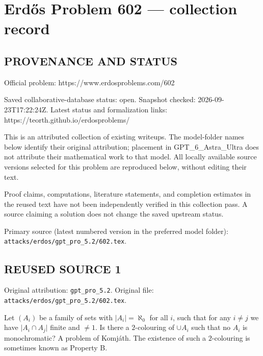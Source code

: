 \section*{Erd\H{o}s Problem 602 --- collection record}

\subsection*{PROVENANCE AND STATUS}
Official problem: https://www.erdosproblems.com/602

Saved collaborative-database status: open.
Snapshot checked: 2026-09-23T17:22:24Z.
Latest status and formalization links: https://teorth.github.io/erdosproblems/

This is an attributed collection of existing writeups. The model-folder names below identify their original attribution; placement in GPT\_6\_Astra\_Ultra does not attribute their mathematical work to that model. All locally available source versions selected for this problem are reproduced below, without editing their text.

Proof claims, computations, literature statements, and completion estimates in the reused text have not been independently verified in this collection pass. A source claiming a solution does not change the saved upstream status.

Primary source (latest numbered version in the preferred model folder): \texttt{attacks/erdos/gpt\_pro\_5.2/602.tex}.

\subsection*{REUSED SOURCE 1}
Original attribution: \texttt{gpt\_pro\_5.2}.
Original file: \texttt{attacks/erdos/gpt\_pro\_5.2/602.tex}.


Let $(A_i)$ be a family of sets with $\lvert A_i\rvert=\aleph_0$ for all $i$, such that for any $i\neq j$ we have $\lvert A_i\cap A_j\rvert$ finite and $\neq 1$. Is there a $2$-colouring of $\cup A_i$ such that no $A_i$ is monochromatic? A problem of Komj\'{a}th. The existence of such a $2$-colouring is sometimes known as Property B.

